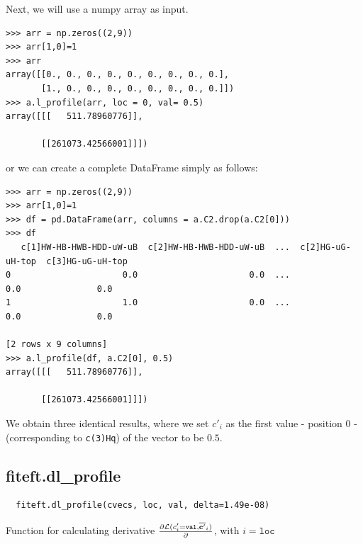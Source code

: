 \documentclass[12pt]{article}
\def\b#1{\boldsymbol{\rm #1}}
\begin{document}
Next, we will use a numpy array as input.
\begin{verbatim}
>>> arr = np.zeros((2,9))
>>> arr[1,0]=1
>>> arr
array([[0., 0., 0., 0., 0., 0., 0., 0., 0.],
       [1., 0., 0., 0., 0., 0., 0., 0., 0.]])
>>> a.l_profile(arr, loc = 0, val= 0.5)
array([[[   511.78960776]],

       [[261073.42566001]]])
\end{verbatim}
or we can create a complete DataFrame simply as follows:
\begin{verbatim}
>>> arr = np.zeros((2,9))
>>> arr[1,0]=1
>>> df = pd.DataFrame(arr, columns = a.C2.drop(a.C2[0]))
>>> df
   c[1]HW-HB-HWB-HDD-uW-uB  c[2]HW-HB-HWB-HDD-uW-uB  ...  c[2]HG-uG-uH-top  c[3]HG-uG-uH-top
0                      0.0                      0.0  ...               0.0               0.0
1                      1.0                      0.0  ...               0.0               0.0

[2 rows x 9 columns]
>>> a.l_profile(df, a.C2[0], 0.5)
array([[[   511.78960776]],

       [[261073.42566001]]])
\end{verbatim}
We obtain three identical results, where we set $c'_i$ as the first value - position 0 - (corresponding to \verb|c(3)Hq|) of the vector to be $0.5$.




\subsection{fiteft.dl\_profile}
\begin{verbatim}
  fiteft.dl_profile(cvecs, loc, val, delta=1.49e-08)
  \end{verbatim}
Function for calculating derivative $\frac{\partial \mathcal{L}(c'_i=\texttt{val},\overline{\b{c}'}_i)}{\partial } $, with $i=\texttt{loc}$
\end{document}
